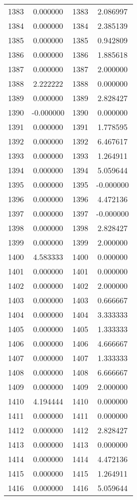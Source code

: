 \documentclass[12pt]{article}
\begin{document}
\begin{longtable}{@{}cccc@{}}
1383 & 0.000000 & 1383 & 2.086997 \\
1384 & 0.000000 & 1384 & 2.385139 \\
1385 & 0.000000 & 1385 & 0.942809 \\
1386 & 0.000000 & 1386 & 1.885618 \\
1387 & 0.000000 & 1387 & 2.000000 \\
1388 & 2.222222 & 1388 & 0.000000 \\
1389 & 0.000000 & 1389 & 2.828427 \\
1390 & -0.000000 & 1390 & 0.000000 \\
1391 & 0.000000 & 1391 & 1.778595 \\
1392 & 0.000000 & 1392 & 6.467617 \\
1393 & 0.000000 & 1393 & 1.264911 \\
1394 & 0.000000 & 1394 & 5.059644 \\
1395 & 0.000000 & 1395 & -0.000000 \\
1396 & 0.000000 & 1396 & 4.472136 \\
1397 & 0.000000 & 1397 & -0.000000 \\
1398 & 0.000000 & 1398 & 2.828427 \\
1399 & 0.000000 & 1399 & 2.000000 \\
1400 & 4.583333 & 1400 & 0.000000 \\
1401 & 0.000000 & 1401 & 0.000000 \\
1402 & 0.000000 & 1402 & 2.000000 \\
1403 & 0.000000 & 1403 & 0.666667 \\
1404 & 0.000000 & 1404 & 3.333333 \\
1405 & 0.000000 & 1405 & 1.333333 \\
1406 & 0.000000 & 1406 & 4.666667 \\
1407 & 0.000000 & 1407 & 1.333333 \\
1408 & 0.000000 & 1408 & 6.666667 \\
1409 & 0.000000 & 1409 & 2.000000 \\
1410 & 4.194444 & 1410 & 0.000000 \\
1411 & 0.000000 & 1411 & 0.000000 \\
1412 & 0.000000 & 1412 & 2.828427 \\
1413 & 0.000000 & 1413 & 0.000000 \\
1414 & 0.000000 & 1414 & 4.472136 \\
1415 & 0.000000 & 1415 & 1.264911 \\
1416 & 0.000000 & 1416 & 5.059644 \\

\end{longtable}
\end{document}
